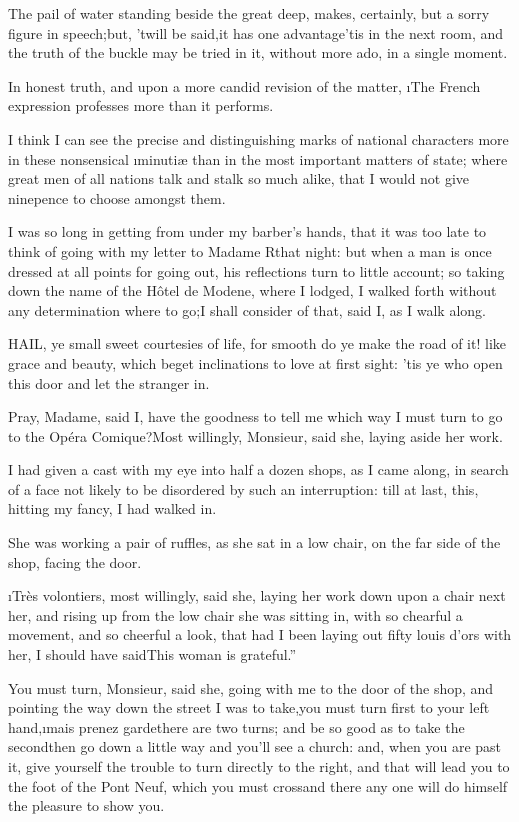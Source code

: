 \documentclass[twoside]{article}
\begin{document}
The pail of water standing beside the great deep, makes, certainly, but a
sorry figure in speech;\tsk but, ’twill be said,\tsk it has one advantage\tsk ’tis in
the next room, and the truth of the buckle may be tried in it, without
more ado, in a single moment.

In honest truth, and upon a more candid revision of the matter, \i{The
French expression professes more than it performs}.

I think I can see the precise and distinguishing marks of national
characters more in these nonsensical \i{minutiæ} than in the most important
matters of state; where great men of all nations talk and stalk so much
alike, that I would not give ninepence to choose amongst them.

I was so long in getting from under my barber’s hands, that it was too
late to think of going with my letter to Madame R\tsk  that night: but when a
man is once dressed at all points for going out, his reflections turn to
little account; so taking down the name of the Hôtel de Modene, where I
lodged, I walked forth without any determination where to go;\tsk I shall
consider of that, said I, as I walk along.






HAIL, ye small sweet courtesies of life, for smooth do ye make the road
of it! like grace and beauty, which beget inclinations to love at first
sight: ’tis ye who open this door and let the stranger in.

\tsk Pray, Madame, said I, have the goodness to tell me which way I must turn
to go to the Opéra Comique?\tsk Most willingly, Monsieur, said she, laying
aside her work.\tsk 

I had given a cast with my eye into half a dozen shops, as I came along,
in search of a face not likely to be disordered by such an interruption:
till at last, this, hitting my fancy, I had walked in.

She was working a pair of ruffles, as she sat in a low chair, on the far
side of the shop, facing the door.

\tsk \i{Très volontiers}, most willingly, said she, laying her work down upon a
chair next her, and rising up from the low chair she was sitting in, with
so chearful a movement, and so cheerful a look, that had I been laying
out fifty louis d’ors with her, I should have said\tsk \lqq This woman is
grateful.”

You must turn, Monsieur, said she, going with me to the door of the shop,
and pointing the way down the street I was to take,\tsk you must turn first
to your left hand,\tsk \i{mais prenez garde}\tsk there are two turns; and be so
good as to take the second\tsk then go down a little way and you’ll see a
church: and, when you are past it, give yourself the trouble to turn
directly to the right, and that will lead you to the foot of the Pont
Neuf, which you must cross\tsk and there any one will do himself the pleasure
to show you.\tsk 
\end{document}
